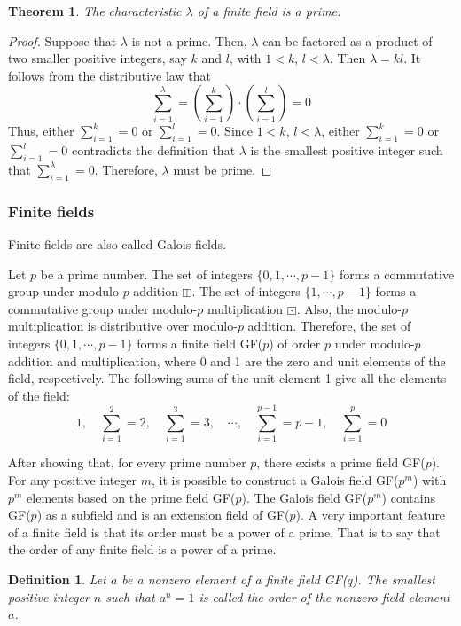\documentclass[11pt]{article}
\newtheorem{theorem}{Theorem}
\newtheorem{definition}{Definition}
\begin{document}
\begin{theorem}
The characteristic $\lambda$ of a finite field is a prime.
\end{theorem}
\begin{proof}
Suppose that $\lambda$ is not a prime. Then, $\lambda$ can be factored as a product of two smaller positive integers, say $k$ and $l$, with $1 < k$, $l<\lambda$. Then $\lambda = kl$. It follows from the distributive law that
\[
\sum_{i=1}^\lambda = \left( \sum_{i=1}^k \right) \cdot \left( \sum_{i=1}^l \right) = 0
\]
Thus, either $\sum_{i=1}^k = 0$ or $\sum_{i=1}^l = 0$. 
Since $1 < k$, $l<\lambda$, either $\sum_{i=1}^k = 0$ or $\sum_{i=1}^l = 0$ contradicts the definition that $\lambda$ is the smallest positive integer such that $\sum_{i=1}^\lambda = 0$.
Therefore, $\lambda$ must be prime.
\end{proof}

\subsubsection{Finite fields}
Finite fields are also called Galois fields.

Let $p$ be a prime number. The set of integers $\{ 0, 1, \cdots, p-1 \}$ forms a commutative group under modulo-$p$ addition $\boxplus$.
The set of integers $\{ 1, \cdots, p-1 \}$ forms a commutative group under modulo-$p$ multiplication $\boxdot$.
Also, the modulo-$p$ multiplication is distributive over modulo-$p$ addition.
Therefore, the set of integers $\{ 0, 1, \cdots, p-1 \}$ forms a finite field GF($p$) of order $p$ under modulo-$p$ addition and multiplication, where 0 and 1 are the zero and unit elements of the field, respectively.
The following sums of the unit element 1 give all the elements of the field:
\[
1,\quad \sum_{i = 1}^2 = 2,\quad \sum_{i = 1}^3 = 3,\quad \cdots ,\quad \sum_{i = 1}^{p-1} = p - 1,\quad \sum_{i = 1}^p = 0
\]

After showing that, for every prime number $p$, there exists a prime field GF($p$). 
For any positive integer $m$, it is possible to construct a Galois field GF($p^m$) with $p^m$ elements based on the prime field GF($p$).
The Galois field GF($p^m$) contains GF($p$) as a subfield and is an extension field of GF($p$). A very important feature of a finite field is that its order must be a power of a prime. That is to say that the order of any finite field is a power of a prime.

\begin{definition}
Let $a$ be a nonzero element of a finite field GF($q$). The smallest positive integer $n$ such that $a^n = 1$ is called the order of the nonzero field element $a$.
\end{definition}
\end{document}
